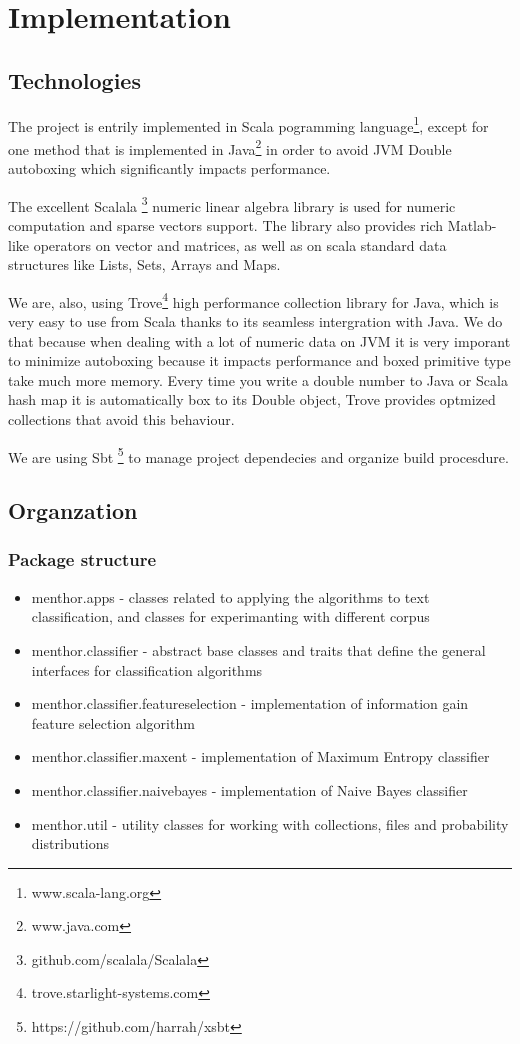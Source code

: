 \documentclass{report}
\begin{document}
\chapter{Implementation}

\section{Technologies}

The project is entrily implemented in Scala pogramming language\footnote{www.scala-lang.org}, except for one method that is implemented in Java\footnote{www.java.com} in order to avoid JVM Double autoboxing which significantly impacts performance.

The excellent Scalala \footnote{github.com/scalala/Scalala} numeric linear algebra library is used for numeric computation and sparse vectors support. The library also provides rich Matlab-like operators on vector and matrices, as well as on scala standard data structures like Lists, Sets, Arrays and Maps.
 
We are, also, using Trove\footnote{trove.starlight-systems.com} high performance collection library for Java, which is very easy to use from Scala thanks to its seamless intergration with Java. We do that because when dealing with a lot of numeric data on JVM it is very imporant to minimize autoboxing because it impacts performance and boxed primitive type take much more memory.  Every time you write a double number to Java or Scala hash map it is automatically box to its Double object, Trove provides optmized collections that avoid this behaviour.

We are using Sbt \footnote{https://github.com/harrah/xsbt} to manage project dependecies and organize build procesdure.

\section{Organzation}

\subsection{Package structure}

\begin{itemize}

\item menthor.apps - classes related to applying the algorithms to text classification, and classes for experimanting with different corpus
\item menthor.classifier - abstract base classes and traits that define the general interfaces for classification algorithms
\item menthor.classifier.featureselection - implementation of information gain feature selection algorithm
\item menthor.classifier.maxent - implementation of Maximum Entropy classifier
\item menthor.classifier.naivebayes - implementation of Naive Bayes classifier
\item menthor.util - utility classes for working with collections, files and probability distributions
\end{itemize}
\end{document}
